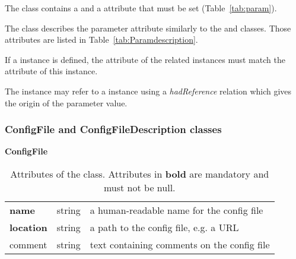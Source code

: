 The  class contains a  and a  attribute that must be set (Table~\ref{tab:param}).

The  class describes the parameter  attribute similarly to the  and  classes. Those attributes are listed in Table~\ref{tab:Paramdescription}.

If a  instance is defined, the  attribute of the related  instances must match the  attribute of this  instance.

The  instance may refer to a  instance using a \textit{hadReference} relation which gives the origin of the parameter value.


\subsubsection{ConfigFile and ConfigFileDescription classes}

\begin{table}[ht]
\small
{}\textwidth
 \textbf{\normalsize ConfigFile}\vspace{0.25em}\\
 \begin{tabulary}{1.0\textwidth}{llL}
 \toprule
  &    & \\
 \midrule
\textbf{name} &  string & a human-readable name for the config file \\
\textbf{location} & string  &  a path to the config file, e.g. a URL \\
comment & string  & text containing comments on the config file  \\
\bottomrule
\end{tabulary}
\caption[Attributes of the  class]{Attributes of the  class. Attributes in \textbf{bold} are mandatory and must not be null.}
\label{tab:configfile}
\end{table}

